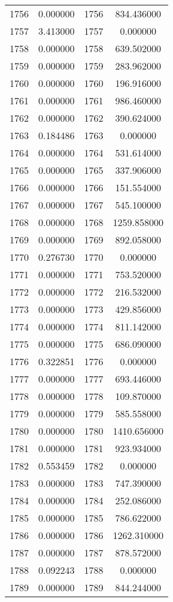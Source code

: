 \documentclass[12pt]{article}
\begin{document}
\begin{longtable}{@{}cccc@{}}
1756 & 0.000000 & 1756 & 834.436000 \\
1757 & 3.413000 & 1757 & 0.000000 \\
1758 & 0.000000 & 1758 & 639.502000 \\
1759 & 0.000000 & 1759 & 283.962000 \\
1760 & 0.000000 & 1760 & 196.916000 \\
1761 & 0.000000 & 1761 & 986.460000 \\
1762 & 0.000000 & 1762 & 390.624000 \\
1763 & 0.184486 & 1763 & 0.000000 \\
1764 & 0.000000 & 1764 & 531.614000 \\
1765 & 0.000000 & 1765 & 337.906000 \\
1766 & 0.000000 & 1766 & 151.554000 \\
1767 & 0.000000 & 1767 & 545.100000 \\
1768 & 0.000000 & 1768 & 1259.858000 \\
1769 & 0.000000 & 1769 & 892.058000 \\
1770 & 0.276730 & 1770 & 0.000000 \\
1771 & 0.000000 & 1771 & 753.520000 \\
1772 & 0.000000 & 1772 & 216.532000 \\
1773 & 0.000000 & 1773 & 429.856000 \\
1774 & 0.000000 & 1774 & 811.142000 \\
1775 & 0.000000 & 1775 & 686.090000 \\
1776 & 0.322851 & 1776 & 0.000000 \\
1777 & 0.000000 & 1777 & 693.446000 \\
1778 & 0.000000 & 1778 & 109.870000 \\
1779 & 0.000000 & 1779 & 585.558000 \\
1780 & 0.000000 & 1780 & 1410.656000 \\
1781 & 0.000000 & 1781 & 923.934000 \\
1782 & 0.553459 & 1782 & 0.000000 \\
1783 & 0.000000 & 1783 & 747.390000 \\
1784 & 0.000000 & 1784 & 252.086000 \\
1785 & 0.000000 & 1785 & 786.622000 \\
1786 & 0.000000 & 1786 & 1262.310000 \\
1787 & 0.000000 & 1787 & 878.572000 \\
1788 & 0.092243 & 1788 & 0.000000 \\
1789 & 0.000000 & 1789 & 844.244000 \\

\end{longtable}
\end{document}
